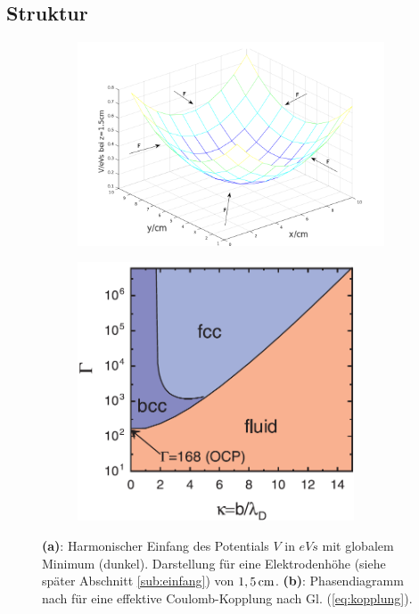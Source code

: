 \documentclass[numbers=noenddot,a4paper,notitlepage,twoside,BCOR15mm]{scrbook}
\newcommand{\fett}[1]{\textbf{#1}}
\begin{document}
				 \subsection{Struktur}

						 \begin{figure}
						 	\centering
						 	\begin{subfigure}[t]{0.48\textwidth}
						 		\centering
						 		\includegraphics[width=1.1\textwidth,height=0.3\textheight]{figs/einfangpotnu.png}
						 		\caption{}
						 		\label{img:potential}
						 	\end{subfigure}
						 	\begin{subfigure}[t]{0.48\textwidth}
						 		\centering
						 		\includegraphics[width=0.9\textwidth,height=0.3\textheight]{figs/gammaphasetransmelzer.png}
						 		\caption{}
						 		\label{img:gamma}
						 	\end{subfigure}
						 	\caption{\fett{(a)}: Harmonischer Einfang des Potentials $V$ in $\unit{eVs}$ mit globalem Minimum (dunkel). Darstellung für eine Elektrodenhöhe (siehe später Abschnitt \ref{sub:einfang}) von $\unit[1,5]{cm}$. \fett{(b)}: Phasendiagramm nach \cite{Melzer12} für eine effektive Coulomb-Kopplung nach Gl. (\ref{eq:kopplung}).}
						 \end{figure}
\end{document}
